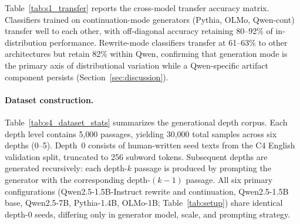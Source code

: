 Table~\ref{tab:s1_transfer} reports the cross-model transfer accuracy matrix.
Classifiers trained on continuation-mode generators (Pythia, OLMo, Qwen-cont) transfer well to each other, with off-diagonal accuracy retaining 80--92\% of in-distribution performance.
Rewrite-mode classifiers transfer at 61--63\% to other architectures but retain 82\% within Qwen, confirming that generation mode is the primary axis of distributional variation while a Qwen-specific artifact component persists (Section~\ref{sec:discussion}).

\begin{table}[!htbp]
  \centering
  \small
  \caption{Cross-model transfer accuracy matrix. Diagonal (\textbf{bold}): within-model; off-diagonal: cross-model. Retention: Pythia$\leftrightarrow$OLMo 89--92\%, Qwen-cont$\leftrightarrow$Pythia 84--85\%, Qwen-rw$\to$Pythia/OLMo 61--63\%, Qwen-rw$\to$Qwen-cont 82\%.}
  \label{tab:s1_transfer}
\end{table}

\paragraph{Dataset construction.}
Table~\ref{tab:s4_dataset_stats} summarizes the generational depth corpus.
Each depth level contains 5{,}000 passages, yielding 30{,}000 total samples across six depths (0--5).
Depth~0 consists of human-written seed texts from the C4 English validation split, truncated to 256 subword tokens.
Subsequent depths are generated recursively: each depth-$k$ passage is produced by prompting the generator with the corresponding depth-$(k{-}1)$ passage.
All six primary configurations (Qwen2.5-1.5B-Instruct rewrite and continuation, Qwen2.5-1.5B base, Qwen2.5-7B, Pythia-1.4B, OLMo-1B; Table~\ref{tab:setup}) share identical depth-0 seeds, differing only in generator model, scale, and prompting strategy.

